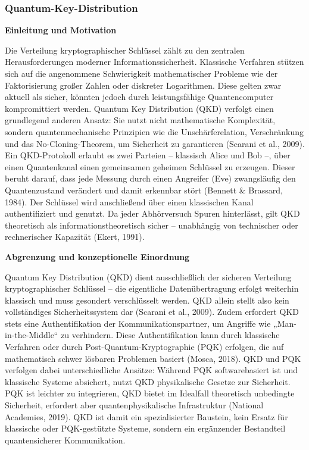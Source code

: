 \subsubsection{Quantum-Key-Distribution}
\noindent\textbf{Einleitung und Motivation}

\noindent
Die Verteilung kryptographischer Schlüssel zählt zu den zentralen Herausforderungen moderner Informationssicherheit. Klassische Verfahren stützen sich auf die angenommene Schwierigkeit mathematischer Probleme wie der Faktorisierung großer Zahlen oder diskreter Logarithmen. Diese gelten zwar aktuell als sicher, könnten jedoch durch leistungsfähige Quantencomputer kompromittiert werden.
Quantum Key Distribution (QKD) verfolgt einen grundlegend anderen Ansatz: Sie nutzt nicht mathematische Komplexität, sondern quantenmechanische Prinzipien wie die Unschärferelation, Verschränkung und das No-Cloning-Theorem, um Sicherheit zu garantieren (Scarani et al., 2009).
Ein QKD-Protokoll erlaubt es zwei Parteien – klassisch Alice und Bob –, über einen Quantenkanal einen gemeinsamen geheimen Schlüssel zu erzeugen. Dieser beruht darauf, dass jede Messung durch einen Angreifer (Eve) zwangsläufig den Quantenzustand verändert und damit erkennbar stört (Bennett & Brassard, 1984).
Der Schlüssel wird anschließend über einen klassischen Kanal authentifiziert und genutzt. Da jeder Abhörversuch Spuren hinterlässt, gilt QKD theoretisch als informationstheoretisch sicher – unabhängig von technischer oder rechnerischer Kapazität (Ekert, 1991).


\vspace{1em}
\noindent\textbf{Abgrenzung und konzeptionelle Einordnung}

\noindent
Quantum Key Distribution (QKD) dient ausschließlich der sicheren Verteilung kryptographischer Schlüssel – die eigentliche Datenübertragung erfolgt weiterhin klassisch und muss gesondert verschlüsselt werden. QKD allein stellt also kein vollständiges Sicherheitssystem dar (Scarani et al., 2009).
Zudem erfordert QKD stets eine Authentifikation der Kommunikationspartner, um Angriffe wie „Man-in-the-Middle“ zu verhindern. Diese Authentifikation kann durch klassische Verfahren oder durch Post-Quantum-Kryptographie (PQK) erfolgen, die auf mathematisch schwer lösbaren Problemen basiert (Mosca, 2018).
QKD und PQK verfolgen dabei unterschiedliche Ansätze: Während PQK softwarebasiert ist und klassische Systeme absichert, nutzt QKD physikalische Gesetze zur Sicherheit. PQK ist leichter zu integrieren, QKD bietet im Idealfall theoretisch unbedingte Sicherheit, erfordert aber quantenphysikalische Infrastruktur (National Academies, 2019).
QKD ist damit ein spezialisierter Baustein, kein Ersatz für klassische oder PQK-gestützte Systeme, sondern ein ergänzender Bestandteil quantensicherer Kommunikation.


